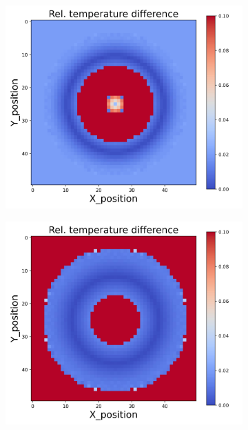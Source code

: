 \begin{figure}[h]
\begin{minipage}{\textwidth}
\begin{subfigure}{0.3\textwidth}
        \end{subfigure}
    \end{minipage}\\
    \begin{minipage}{\textwidth}
        \centering
        \begin{subfigure}{0.3\textwidth}
            \centering
            \includegraphics[width=\textwidth]{figures/raw_data/25/quad/T_bias.jpg}
        \end{subfigure}
        \begin{subfigure}{0.3\textwidth}
            \centering
            \includegraphics[width=\textwidth]{figures/raw_data/26/quad/T_bias.jpg}

\end{subfigure}
\end{minipage}
\end{figure}
